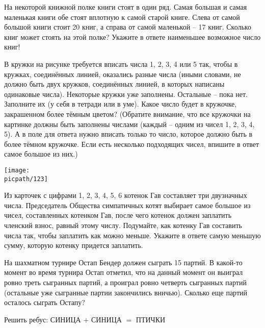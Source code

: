 \begin{consultation}
	\begin{listofex}
	\item На некоторой книжной полке книги стоят в один ряд. Самая большая и самая маленькая книги обе стоят вплотную к самой старой книге. Слева от самой большой книги стоит 20 книг, а справа от самой маленькой – 17 книг. Сколько книг может стоять на этой полке? Укажите в ответе наименьшее возможное число книг!
	\item В кружки на рисунке требуется вписать числа 1, 2, 3, 4 или 5 так, чтобы в кружках, соединённых линией, оказались разные числа (иными словами, не должно быть двух
	кружков, соединённых линией, в которых написаны одинаковые числа). Некоторые
	кружки уже заполнены. Остальные – пока нет. Заполните их (у себя в тетради или в
	уме). Какое число будет в кружочке, закрашенном более тёмным цветом? (Обратите
	внимание, что все кружочки на картинке должны быть заполнены числами (каждый
	– одним из чисел 1, 2, 3, 4, 5). А в поле для ответа нужно вписать только то число,
	которое должно быть в более тёмном кружочке. Если есть несколько подходящих
	чисел, впишите в ответ самое большое из них.)
	\begin{center}
		\texttt{[image: \\picpath/123]}
	\end{center}
	\item Из карточек с цифрами 1, 2, 3, 4, 5, 6 котенок Гав составляет три двузначных числа.
	Председатель Общества симпатичных котят выбирает самое большое из чисел, составленных котенком Гав, после чего котенок должен заплатить членский взнос, равный
	этому числу. Подумайте, как котенку Гав составить числа так, чтобы заплатить как
	можно меньше. Укажите в ответе самую меньшую сумму, которую котенку придется заплатить.
	\item На шахматном турнире Остап Бендер должен сыграть 15 партий. В какой-то момент во время турнира Остап отметил, что на данный момент он выиграл ровно треть
	сыгранных партий, а проиграл ровно четверть сыгранных партий (остальные уже сыгранные партии закончились вничью). Сколько еще партий осталось сыграть Остапу?
	\item Решить ребус: СИНИЦА \( + \) СИНИЦА \( = \) ПТИЧКИ
\end{listofex}
\end{consultation}

